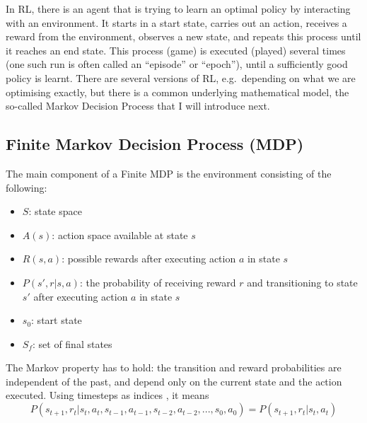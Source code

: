 In RL, there is an agent that is trying to learn an optimal policy by interacting with an environment. It starts in a start state, carries out an action, receives a reward from the environment, observes a new state, and repeats this process until it reaches an end state. This process (game) is executed (played) several times (one such run is often called an ``episode'' or ``epoch''), until a sufficiently good policy is learnt. There are several versions of RL, e.g.\ depending on what we are optimising exactly, but there is a common underlying mathematical model, the so-called Markov Decision Process that I will introduce next.

\subsection{Finite Markov Decision Process (MDP)}


The main component of a Finite MDP is the environment consisting of the following:
\begin{itemize}[itemsep=0pt]
    \item  $S$: state space
    \item
    $A(s)$: action space available at state $s$
    \item
    $R(s, a)$: possible rewards after executing action $a$ in state $s$
    \item
    $P(s', r | s, a)$: the probability of receiving reward $r$ and transitioning to state $s'$ after executing action $a$ in state $s$
    \item
    $s_0$: start state
    \item
    $S_f$: set of final states
\end{itemize} 


The Markov property has to hold: the transition and reward probabilities are independent of the past, and depend only on the current state and the action executed. Using timesteps as indices , it means
\begin{equation} \label{eq:MarkovProperty}
P(s_{t+1},r_{t} | s_{t}, a_{t}, s_{t-1}, a_{t-1}, s_{t-2}, a_{t-2}, ..., s_{0}, a_{0}) = P(s_{t+1},r_{t} | s_{t}, a_{t})
\end{equation}

